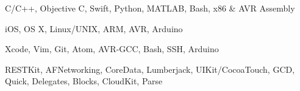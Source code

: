 

\begin{cvskills}
    

    {C/C++, Objective C, Swift, Python, MATLAB, Bash, x86 \& AVR Assembly}

    {iOS, OS X, Linux/UNIX, ARM, AVR, Arduino}

    {Xcode, Vim, Git, Atom, AVR-GCC, Bash, SSH, Arduino}
    

    {RESTKit, AFNetworking, CoreData, Lumberjack, UIKit/CocoaTouch, GCD, Quick, Delegates, Blocks, CloudKit, Parse}

\end{cvskills}



    
